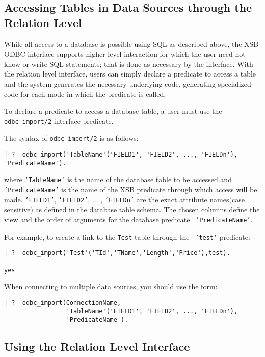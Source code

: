 \subsection{Accessing Tables in Data Sources through the Relation Level}

While all access to a database is possible using SQL as described
above, the XSB-ODBC interface supports higher-level interaction for
which the user need not know or write SQL statements; that is done as
necessary by the interface.  With the relation level interface, users
can simply declare a predicate to access a table and the system
generates the necessary underlying code, generating specialized code
for each mode in which the predicate is called.

To declare a predicate to access a database table, a user must use the
{\tt odbc\_import/2} interface predicate.

The syntax of  {\tt odbc\_import/2} is as follows:

\begin{verbatim}
| ?- odbc_import('TableName'('FIELD1', 'FIELD2', ..., 'FIELDn'), 'PredicateName').
\end{verbatim}
\noindent
where {\tt 'TableName'} is the name of the database table to be
accessed and {\tt 'PredicateName'} is the name of the XSB predicate
through which access will be made. {\tt 'FIELD1'}, {\tt 'FIELD2'},
... , {\tt 'FIELDn'} are the exact attribute names$($case sensitive$)$
as defined in the database table schema.  The chosen columns define
the view and the order of arguments for the database predicate {\tt
'PredicateName'}.
 
For example, to create a link to the {\tt Test} table through the {\tt
'test'} predicate:
\begin{verbatim}
| ?- odbc_import('Test'('TId','TName','Length','Price'),test).

yes
\end{verbatim}

When connecting to multiple data sources, you should use the form:
\begin{verbatim}
| ?- odbc_import(ConnectionName,
                 'TableName'('FIELD1', 'FIELD2', ..., 'FIELDn'),
                 'PredicateName').
\end{verbatim}


\subsection{Using the Relation Level Interface}

